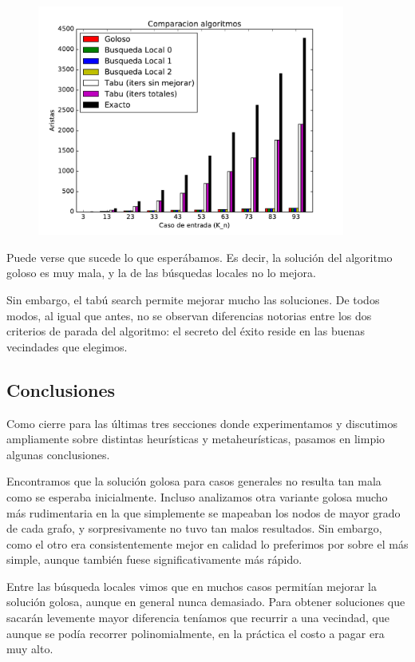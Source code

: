 \begin{figure}[H]
 \centering
	\includegraphics[width=0.9\textwidth]{graficos/problema_7/exacto0.pdf}
	\caption{}
	\label{fig:problema7-exacto0}
\end{figure}


Puede verse que sucede lo que esperábamos. Es decir, la solución del algoritmo goloso es muy mala, y la de las búsquedas locales no lo mejora.

Sin embargo, el tabú search permite mejorar mucho las soluciones. De todos modos, al igual que antes, no se observan diferencias notorias entre los dos criterios de parada del algoritmo: el secreto del éxito reside en las buenas vecindades que elegimos.

\subsection{Conclusiones}
Como cierre para las últimas tres secciones donde experimentamos y discutimos ampliamente sobre distintas heurísticas y metaheurísticas, pasamos en limpio algunas conclusiones.

Encontramos que la solución golosa para casos generales no resulta tan mala como se esperaba inicialmente. Incluso analizamos otra variante golosa mucho más rudimentaria en la que simplemente se mapeaban los nodos de mayor grado de cada grafo, y sorpresivamente no tuvo tan malos resultados. Sin embargo, como el otro era consistentemente mejor en calidad lo preferimos por sobre el más simple, aunque también fuese significativamente más rápido. 

Entre las búsqueda locales vimos que en muchos casos permitían mejorar la solución golosa, aunque en general nunca demasiado. Para obtener soluciones que sacarán levemente mayor diferencia teníamos que recurrir a una vecindad, que aunque se podía recorrer polinomialmente, en la práctica el costo a pagar era muy alto. 

